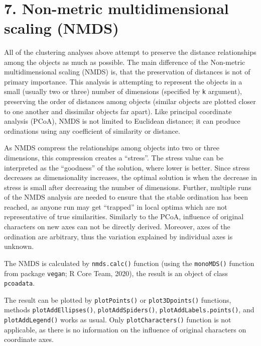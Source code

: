 \documentclass[
]{article}
\begin{document}
~

\hypertarget{non-metric-multidimensional-scaling-nmds}{%
\section{7. Non-metric multidimensional scaling
(NMDS)}\label{non-metric-multidimensional-scaling-nmds}}

All of the clustering analyses above attempt to preserve the distance
relationships among the objects as much as possible. The main difference
of the Non-metric multidimensional scaling (NMDS) is, that the
preservation of distances is not of primary importance. This analysis is
attempting to represent the objects in a small (usually two or three)
number of dimensions (specified by \texttt{k} argument), preserving the
order of distances among objects (similar objects are plotted closer to
one another and dissimilar objects far apart). Like principal coordinate
analysis (PCoA), NMDS is not limited to Euclidean distance; it can
produce ordinations using any coefficient of similarity or distance.

As NMDS compress the relationships among objects into two or three
dimensions, this compression creates a ``stress''. The stress value can
be interpreted as the ``goodness'' of the solution, where lower is
better. Since stress decreases as dimensionality increases, the optimal
solution is when the decrease in stress is small after decreasing the
number of dimensions. Further, multiple runs of the NMDS analysis are
needed to ensure that the stable ordination has been reached, as anyone
run may get ``trapped'' in local optima which are not representative of
true similarities. Similarly to the PCoA, influence of original
characters on new axes can not be directly derived. Moreover, axes of
the ordination are arbitrary, thus the variation explained by individual
axes is unknown.

The NMDS is calculated by \texttt{nmds.calc()} function (using the
\texttt{monoMDS()} function from package \texttt{vegan}; R Core Team,
2020), the result is an object of class \texttt{pcoadata}.

The result can be plotted by \texttt{plotPoints()} or
\texttt{plot3Dpoints()} functions, methods \texttt{plotAddEllipses()},
\texttt{plotAddSpiders()}, \texttt{plotAddLabels.points()}, and
\texttt{plotAddLegend()} works as usual. Only \texttt{plotCharacters()}
function is not applicable, as there is no information on the influence
of original characters on coordinate axes.
\end{document}
